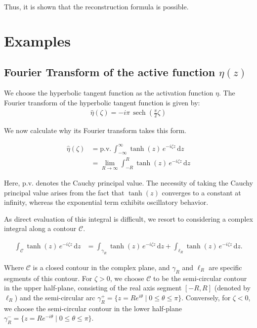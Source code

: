 \documentclass[a4paper,12pt]{article}
\newcommand{\sech}{\operatorname{sech}}
\newcommand{\intinf}{\int_{-\infty}^{\infty}}
\newcommand{\z}{\zeta}
\newcommand{\dd}{\mathrm{d}}
\newcommand{\etahat}{\widehat{\eta}}
\begin{document}
Thus, it is shown that the reconstruction formula is possible.

\clearpage


\section{Examples}
\subsection{Fourier Transform of the active function $\eta(z)$}

We choose the hyperbolic tangent function as the activation function $\eta$.
The Fourier transform of the hyperbolic tangent function is given by:
\begin{align}
  \etahat(\z) = -i \pi \, \sech\left(\frac{\pi}{2} \z\right)
\end{align}

We now calculate why its Fourier transform takes this form.

\begin{align*}
  \etahat(\z) &= \text{p.v.}\, \intinf \tanh(z) \, e^{-i\z z} \, \dd z \\
  &= \lim_{R \to \infty} \int_{-R}^{R} \tanh(z) \, e^{-i\z z} \, \dd z 
\end{align*}

Here, p.v. denotes the Cauchy principal value. The necessity of taking the Cauchy principal value arises from the fact that $\tanh(z)$ converges to a constant at infinity, whereas the exponential term exhibits oscillatory behavior.

As direct evaluation of this integral is difficult, we resort to considering a complex integral along a contour $\mathcal{C}$.

\begin{align*}
  \int_{\mathcal{C}} \tanh(z) \, e^{-i\z z} \, \dd z &= \int_{\gamma_R} \tanh(z) \, e^{-i\z z} \, \dd z + \int_{\ell_R} \tanh(z) \, e^{-i\z z} \, \dd z.
\end{align*}

Where $\mathcal{C}$ is a closed contour in the complex plane, and $\gamma_R$ and $\ell_R$ are specific segments of this contour. For $\zeta > 0$, we choose $\mathcal{C}$ to be the semi-circular contour in the upper half-plane,
consisting of the real axis segment $[-R, R]$ (denoted by $\ell_R$) and the semi-circular arc $\gamma^+_R = \{ z = R e^{i\theta} \mid 0 \leq \theta \leq \pi \}$. Conversely, for $\zeta < 0$,
we choose the semi-circular contour in the lower half-plane $\gamma^-_R = \{ z = R e^{-i\theta} \mid 0 \leq \theta \leq \pi \}$.
\end{document}
